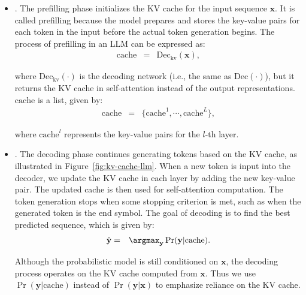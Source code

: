 \begin{itemize}
\item \vspace{0.5em} . The prefilling phase initializes the KV cache for the input sequence $\mathbf{x}$.  It is called prefilling because the model prepares and stores the key-value pairs for each token in the input before the actual token generation begins. The process of prefilling in an LLM can be expressed as:
    \begin{eqnarray}
    \mathrm{cache} & = & \mathrm{Dec}_{\mathrm{kv}}(\mathbf{x}), \label{eq:prefilling-kv-cache}
    \end{eqnarray}

    \noindent where $\mathrm{Dec}_{\mathrm{kv}}(\cdot)$ is the decoding network (i.e., the same as $\mathrm{Dec}(\cdot)$), but it returns the KV cache in self-attention instead of the output representations. $\mathrm{cache}$ is a list, given by:
    \begin{eqnarray}
    \mathrm{cache} & = & \{\mathrm{cache}^1,\cdots,\mathrm{cache}^L\},
    \end{eqnarray}

    \noindent where $\mathrm{cache}^l$ represents the key-value pairs for the $l$-th layer.

\item \vspace{0.3em} . The decoding phase continues generating tokens based on the KV cache, as illustrated in Figure~\ref{fig:kv-cache-llm}. When a new token is input into the decoder, we update the KV cache in each layer by adding the new key-value pair. The updated cache is then used for self-attention computation.  The token generation stops when some stopping criterion is met, such as when the generated token is the end symbol. The goal of decoding is to find the best predicted sequence, which is given by:
    \begin{eqnarray}
    \hat{\mathbf{y}} & = & \argmax_{\mathbf{y}} \Pr(\mathbf{y}|\mathrm{cache}). \label{eq:llm-argmax-kv-cache}
    \end{eqnarray}

    \noindent Although the probabilistic model is still conditioned on $\mathbf{x}$, the decoding process operates on the KV cache computed from $\mathbf{x}$. Thus we use $\Pr(\mathbf{y}|\mathrm{cache})$ instead of $\Pr(\mathbf{y}|\mathbf{x})$ to emphasize reliance on the KV cache.
\end{itemize}
\vspace{0.5em}

